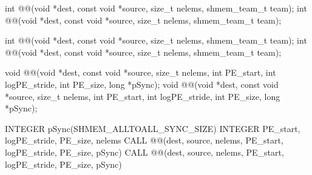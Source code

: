 
\begin{apidefinition}

{\color{Green}
\begin{C11synopsis}
int @@(void *dest, const void *source, size_t nelems, shmem_team_t team);
int @@(void *dest, const void *source, size_t nelems, shmem_team_t team);
\end{C11synopsis}
}

\begin{Csynopsis}
\end{Csynopsis}
{\color{Green}
\begin{CsynopsisCol}
int @@(void *dest, const void *source, size_t nelems, shmem_team_t team);
int @@(void *dest, const void *source, size_t nelems, shmem_team_t team);
\end{CsynopsisCol}
}

\begin{DeprecateBlock}
\begin{CsynopsisCol}
void @@(void *dest, const void *source, size_t nelems, int PE_start, int logPE_stride, int PE_size, long *pSync);
void @@(void *dest, const void *source, size_t nelems, int PE_start, int logPE_stride, int PE_size, long *pSync);
\end{CsynopsisCol}
\end{DeprecateBlock}

\begin{Fsynopsis}
INTEGER pSync(SHMEM_ALLTOALL_SYNC_SIZE)
INTEGER PE_start, logPE_stride, PE_size, nelems
CALL @@(dest, source, nelems, PE_start, logPE_stride, PE_size, pSync)
CALL @@(dest, source, nelems, PE_start, logPE_stride, PE_size, pSync)
\end{Fsynopsis}

\begin{apiarguments}



\end{apiarguments}
\end{apidefinition}
